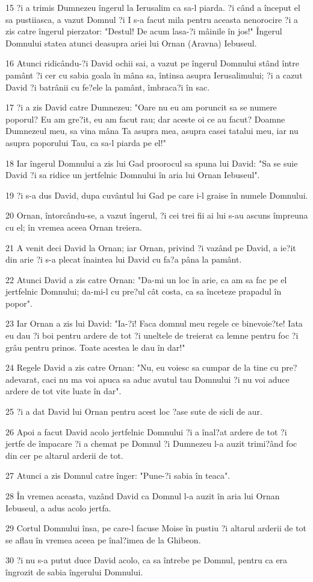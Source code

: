 \par 15 ?i a trimis Dumnezeu îngerul la Ierusalim ca sa-l piarda. ?i când a început el sa pustiiasca, a vazut Domnul ?i I s-a facut mila pentru aceasta nenorocire ?i a zis catre îngerul pierzator: "Destul! De acum lasa-?i mâinile în jos!" Îngerul Domnului statea atunci deasupra ariei lui Ornan (Aravna) Iebuseul.
\par 16 Atunci ridicându-?i David ochii sai, a vazut pe îngerul Domnului stând între pamânt ?i cer cu sabia goala în mâna sa, întinsa asupra Ierusalimului; ?i a cazut David ?i batrânii cu fe?ele la pamânt, îmbraca?i în sac.
\par 17 ?i a zis David catre Dumnezeu: "Oare nu eu am poruncit sa se numere poporul? Eu am gre?it, eu am facut rau; dar aceste oi ce au facut? Doamne Dumnezeul meu, sa vina mâna Ta asupra mea, asupra casei tatalui meu, iar nu asupra poporului Tau, ca sa-l piarda pe el!"
\par 18 Iar îngerul Domnului a zis lui Gad proorocul sa spuna lui David: "Sa se suie David ?i sa ridice un jertfelnic Domnului în aria lui Ornan Iebuseul".
\par 19 ?i s-a dus David, dupa cuvântul lui Gad pe care i-l graise în numele Domnului.
\par 20 Ornan, întorcându-se, a vazut îngerul, ?i cei trei fii ai lui s-au ascuns împreuna cu el; în vremea aceea Ornan treiera.
\par 21 A venit deci David la Ornan; iar Ornan, privind ?i vazând pe David, a ie?it din arie ?i s-a plecat înaintea lui David cu fa?a pâna la pamânt.
\par 22 Atunci David a zis catre Ornan: "Da-mi un loc în arie, ca am sa fac pe el jertfelnic Domnului; da-mi-l cu pre?ul cât costa, ca sa înceteze prapadul în popor".
\par 23 Iar Ornan a zis lui David: "Ia-?i! Faca domnul meu regele ce binevoie?te! Iata eu dau ?i boi pentru ardere de tot ?i uneltele de treierat ca lemne pentru foc ?i grâu pentru prinos. Toate acestea le dau în dar!"
\par 24 Regele David a zis catre Ornan: "Nu, eu voiesc sa cumpar de la tine cu pre? adevarat, caci nu ma voi apuca sa aduc avutul tau Domnului ?i nu voi aduce ardere de tot vite luate în dar".
\par 25 ?i a dat David lui Ornan pentru acest loc ?ase sute de sicli de aur.
\par 26 Apoi a facut David acolo jertfelnic Domnului ?i a înal?at ardere de tot ?i jertfe de împacare ?i a chemat pe Domnul ?i Dumnezeu l-a auzit trimi?ând foc din cer pe altarul arderii de tot.
\par 27 Atunci a zis Domnul catre înger: "Pune-?i sabia în teaca".
\par 28 În vremea aceasta, vazând David ca Domnul l-a auzit în aria lui Ornan Iebuseul, a adus acolo jertfa.
\par 29 Cortul Domnului însa, pe care-l facuse Moise în pustiu ?i altarul arderii de tot se aflau în vremea aceea pe înal?imea de la Ghibeon.
\par 30 ?i nu s-a putut duce David acolo, ca sa întrebe pe Domnul, pentru ca era îngrozit de sabia îngerului Domnului.

